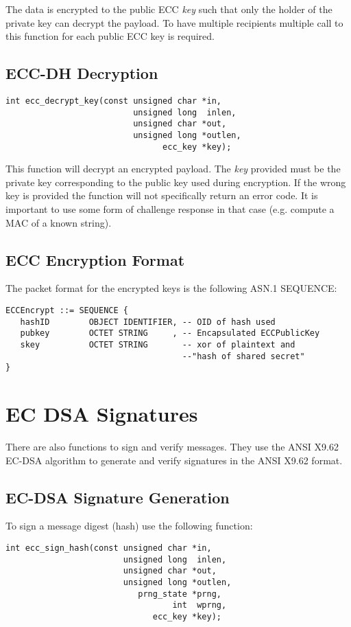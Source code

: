 \documentclass[synpaper]{book}
\newcommand{\mysection}[1]    %
	{                   %
	\section{#1}
   \markboth{\textsf{www.libtom.org}}{\thesection ~ {#1}}
	}
\begin{document}
The data is encrypted to the public ECC \textit{key} such that only the holder of the private key can decrypt the payload.  To have multiple
recipients multiple call to this function for each public ECC key is required.

\subsection{ECC-DH Decryption}
\begin{verbatim}
int ecc_decrypt_key(const unsigned char *in,
                          unsigned long  inlen,
                          unsigned char *out,
                          unsigned long *outlen,
                                ecc_key *key);
\end{verbatim}

This function will decrypt an encrypted payload.  The \textit{key} provided must be the private key corresponding to the public key
used during encryption.  If the wrong key is provided the function will not specifically return an error code.  It is important
to use some form of challenge response in that case (e.g. compute a MAC of a known string).

\subsection{ECC Encryption Format}
The packet format for the encrypted keys is the following ASN.1 SEQUENCE:

\begin{verbatim}
ECCEncrypt ::= SEQUENCE {
   hashID        OBJECT IDENTIFIER, -- OID of hash used
   pubkey        OCTET STRING     , -- Encapsulated ECCPublicKey
   skey          OCTET STRING       -- xor of plaintext and
                                    --"hash of shared secret"
}
\end{verbatim}

\mysection{EC DSA Signatures}

There are also functions to sign and verify messages.  They use the ANSI X9.62 EC-DSA algorithm to generate and verify signatures in the
ANSI X9.62 format.

\subsection{EC-DSA Signature Generation}
To sign a message digest (hash) use the following function:

\begin{verbatim}
int ecc_sign_hash(const unsigned char *in,
                        unsigned long  inlen,
                        unsigned char *out,
                        unsigned long *outlen,
                           prng_state *prng,
                                  int  wprng,
                              ecc_key *key);
\end{verbatim}
\end{document}
